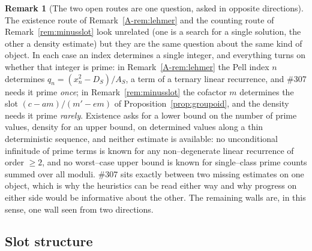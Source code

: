 \documentclass[11pt]{article}
\theoremstyle{definition}
\newtheorem{remark}[theorem]{Remark}
\begin{document}
\begin{remark}[The two open routes are one question, asked in opposite directions]\label{rem:onequestion}
The existence route of Remark~\ref{A-rem:lehmer} and the counting route of
Remark~\ref{rem:minusslot} look unrelated (one is a search for a single solution, the other a
density estimate) but they are the same question about the same kind of object. In each case an
index determines a single integer, and everything turns on whether that integer is prime: in
Remark~\ref{A-rem:lehmer} the Pell index $n$ determines $q_n=(x_n^2-D_S)/A_S$, a term of a ternary
linear recurrence, and \#307 needs it prime \emph{once}; in Remark~\ref{rem:minusslot} the cofactor
$m$ determines the slot $(c-am)/(m'-em)$ of Proposition~\ref{prop:groupoid}, and the density needs
it prime \emph{rarely}. Existence asks for a lower bound on the number of prime values, density for
an upper bound, on determined values along a thin deterministic sequence, and neither estimate is
available: no unconditional infinitude of prime terms is known for any non--degenerate linear
recurrence of order $\ge2$, and no worst--case upper bound is known for single--class prime counts
summed over all moduli. \#307 sits exactly between two missing estimates on one object, which is why
the heuristics can be read either way and why progress on either side would be informative about the
other. The remaining walls are, in this sense, one wall seen from two directions.
\end{remark}

\subsection{Slot structure}\label{ssec:slotstructure}
\end{document}
